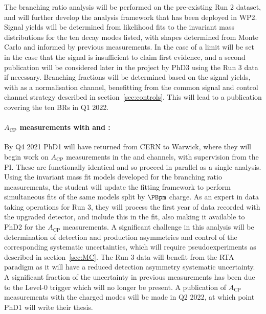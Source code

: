 \documentclass[11pt,a4paper]{article}
\begin{document}
The branching ratio analysis will be performed on the pre-existing Run 2 dataset, and will further develop the analysis framework that has been deployed in WP2. Signal yields will be determined from likelihood fits to the invariant mass distributions for the ten decay modes listed, with shapes determined from Monte Carlo and informed by previous measurements. In the case of \HepProcess{\PBzero\to\PDsplus\PDsminus} a limit will be set in the case that the signal is insufficient to claim first evidence, and a second publication will be considered later in the project by PhD3 using the Run 3 data if necessary. Branching fractions will be determined based on the signal yields, with \HepProcess{\PBminus\to\PDsminus\PDzero} as a normalisation channel, benefitting from the common signal and control channel strategy described in section~\ref{sec:controls}. This will lead to a publication covering the ten BRs in Q1 2022. 

\paragraph{$A_{\text{CP}}$ measurements with \HepProcess{\PBminus\to\PDminus\PDzero} and \HepProcess{\PBminus\to\PDsminus\PDzero}:}
By Q4 2021 PhD1 will have returned from CERN to Warwick, where they will begin work on $A_{\text{CP}}$ measurements in the  \HepProcess{\PBminus\to\PDminus\PDzero} and \HepProcess{\PBminus\to\PDsminus\PDzero} channels, with supervision from the PI. These are functionally identical and so proceed in parallel as a single analysis. Using the invariant mass fit models developed for the branching ratio measurements, the student will update the fitting framework to perform simultaneous fits of the same models split by $\PBpm$ charge. As an expert in data taking operations for Run 3, they will process the first year of data recorded with the upgraded detector, and include this in the fit, also making it available to PhD2 for the \PBzero $A_{\text{CP}}$ measurements.
A significant challenge in this analysis will be determination of detection and production asymmetries and control of the corresponding systematic uncertainties, which will require pseudoexperiments as described in section~\ref{sec:MC}. The Run 3 data will benefit from the RTA paradigm as it will have a reduced detection asymmetry systematic uncertainty. A significant fraction of the uncertainty in previous measurements has been due to the Level-0 trigger which will no longer be present.  A publication of $A_{\text{CP}}$ measurements with the charged modes will be made in Q2 2022, 
at which point PhD1 will write their thesis. 
\end{document}
